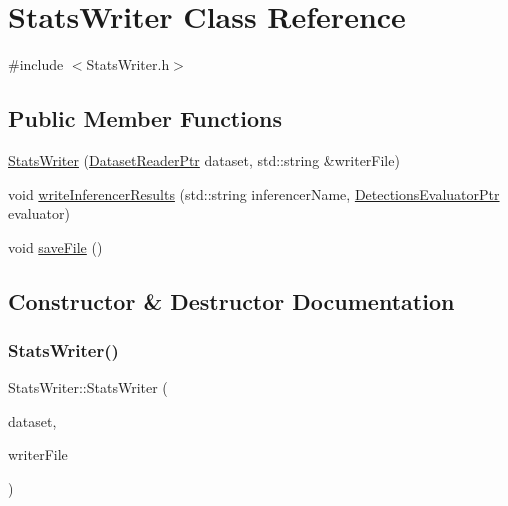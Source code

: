 \hypertarget{class_stats_writer}{}\section{Stats\+Writer Class Reference}
\label{class_stats_writer}


{\ttfamily \#include $<$Stats\+Writer.\+h$>$}

\subsection*{Public Member Functions}
\begin{DoxyCompactItemize}
\item 
\hyperlink{class_stats_writer_aebab85adf064e61088b43c861fb33072}{Stats\+Writer} (\hyperlink{_dataset_reader_8h_a30d89cba514a220d64d04535c0465f1c}{Dataset\+Reader\+Ptr} dataset, std\+::string \&writer\+File)
\item 
void \hyperlink{class_stats_writer_a3eaa872621d87d7c26df3d4d810ee759}{write\+Inferencer\+Results} (std\+::string inferencer\+Name, \hyperlink{_detections_evaluator_8h_ad123715cbea5e203556b7efa1ec44d77}{Detections\+Evaluator\+Ptr} evaluator)
\item 
void \hyperlink{class_stats_writer_ad81e2697e713bfc4903b1260b3e5d952}{save\+File} ()
\end{DoxyCompactItemize}


\subsection{Constructor \& Destructor Documentation}
\mbox{\label{class_stats_writer_aebab85adf064e61088b43c861fb33072}} 
\subsubsection{\texorpdfstring{Stats\+Writer()}{StatsWriter()}}
{\footnotesize\ttfamily Stats\+Writer\+::\+Stats\+Writer (\begin{DoxyParamCaption}\item[{\hyperlink{_dataset_reader_8h_a30d89cba514a220d64d04535c0465f1c}{Dataset\+Reader\+Ptr}}]{dataset,  }\item[{std\+::string \&}]{writer\+File }\end{DoxyParamCaption})}



